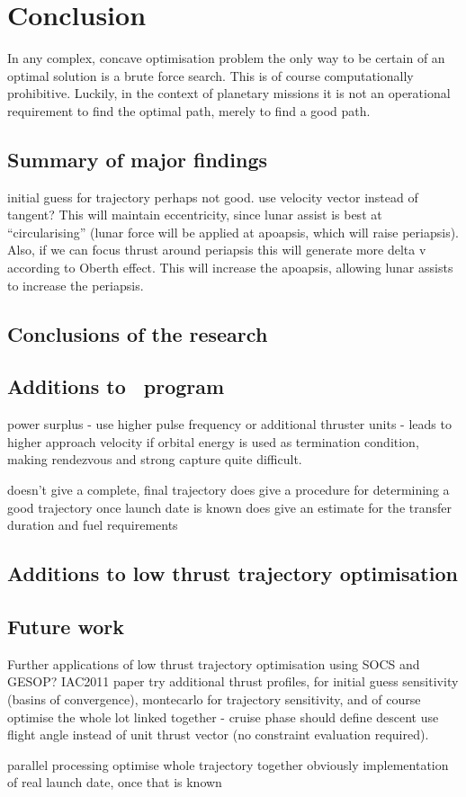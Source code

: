 \chapter{Conclusion} \label{cha:Conclusion}

In any complex, concave optimisation problem the only way to be certain of an optimal solution is a brute force search. This is of course computationally prohibitive. Luckily, in the context of planetary missions it is not an operational requirement to find the optimal path, merely to find a good path. 


\section{Summary of major findings}
initial guess for trajectory perhaps not good. use velocity vector instead of tangent? This will maintain eccentricity, since lunar assist is best at \enquote{circularising} (lunar force will be applied at apoapsis, which will raise periapsis).
Also, if we can focus thrust around periapsis this will generate more delta v according to Oberth effect. This will increase the apoapsis, allowing lunar assists to increase the periapsis.

\section{Conclusions of the research}

\section{Additions to \BW\ program}
power surplus - use higher pulse frequency or additional thruster units - leads to higher approach velocity if orbital energy is used as termination condition, making rendezvous and strong capture quite difficult.

doesn't give a complete, final trajectory
does give a procedure for determining a good trajectory once launch date is known
does give an estimate for the transfer duration and fuel requirements

\section{Additions to low thrust trajectory optimisation}

\section{Future work}
Further applications of low thrust trajectory optimisation using SOCS and GESOP? IAC2011 paper
try additional thrust profiles, for initial guess sensitivity (basins of convergence), montecarlo for trajectory sensitivity, and of course optimise the whole lot linked together - cruise phase should define descent
use flight angle instead of unit thrust vector (no constraint evaluation required).

parallel processing
optimise whole trajectory together
obviously implementation of real launch date, once that is known






